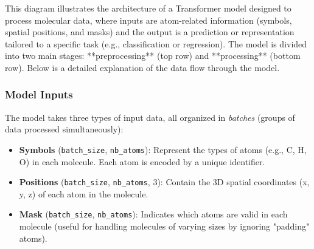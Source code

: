 \documentclass{article}
\begin{document}
\begin{center}
\begin{adjustbox}{max width=\textwidth}
\end{adjustbox}
\end{center}

This diagram illustrates the architecture of a Transformer model designed to process molecular data, where inputs are atom-related information (symbols, spatial positions, and masks) and the output is a prediction or representation tailored to a specific task (e.g., classification or regression). The model is divided into two main stages: **preprocessing** (top row) and **processing** (bottom row). Below is a detailed explanation of the data flow through the model.

\subsubsection{Model Inputs}
The model takes three types of input data, all organized in \textit{batches} (groups of data processed simultaneously):

\begin{itemize}
    \item \textbf{Symbols} (\texttt{batch\_size}, \texttt{nb\_atoms}): Represent the types of atoms (e.g., C, H, O) in each molecule. Each atom is encoded by a unique identifier.
    \item \textbf{Positions} (\texttt{batch\_size}, \texttt{nb\_atoms}, 3): Contain the 3D spatial coordinates (x, y, z) of each atom in the molecule.
    \item \textbf{Mask} (\texttt{batch\_size}, \texttt{nb\_atoms}): Indicates which atoms are valid in each molecule (useful for handling molecules of varying sizes by ignoring "padding" atoms).
\end{itemize}
\end{document}
